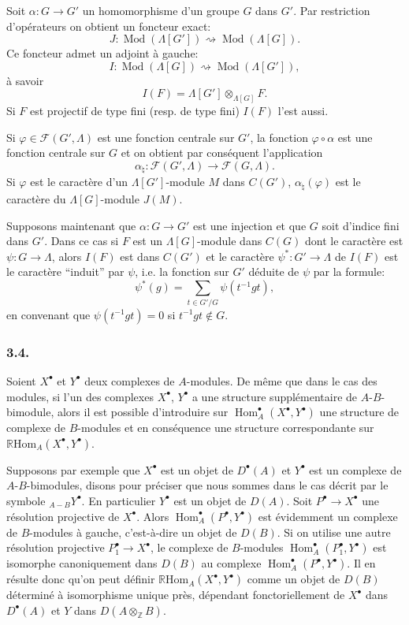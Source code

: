 \documentclass[11pt]{article}
\DeclareMathOperator{\Hom}{Hom}
\newcommand{\R}{\mathbb{R}}\newcommand{\RHomCore}{\mathbb{R}\mathrm{Hom}}
\providecommand{\RHom}{\RHomCore}
\providecommand{\RHom}{\RHomCore}
\providecommand{\Hom}{\operatorname{Hom}}
\providecommand{\RHom}{\R\mathcal{H}om}
\providecommand{\R}{\mathrm R}
\providecommand{\Mod}{\operatorname{Mod}}
\providecommand{\RHom}{\RHomCore}
\providecommand{\Hom}{\operatorname{Hom}}
\begin{document}
Soit $\alpha:G\to G'$ un homomorphisme d'un groupe $G$ dans $G'$. Par restriction d'opérateurs on obtient un foncteur exact:
\[
J:\Mod(\Lambda[G'])\rightsquigarrow\Mod(\Lambda[G]).
\]
Ce foncteur admet un adjoint à gauche:
\[
I:\Mod(\Lambda[G])\rightsquigarrow\Mod(\Lambda[G']),
\]
à savoir
\[
I(F)=\Lambda[G']\otimes_{\Lambda[G]}F.
\]
Si $F$ est projectif de type fini (resp. de type fini) $I(F)$ l'est aussi.

Si $\varphi\in\mathcal F(G',\Lambda)$ est une fonction centrale sur $G'$, la fonction $\varphi\circ\alpha$ est une fonction centrale sur $G$ et on obtient par conséquent l'application
\[
\alpha_\natural: \mathcal F(G',\Lambda)\longrightarrow\mathcal F(G,\Lambda).
\]
Si $\varphi$ est le caractère d'un $\Lambda[G']$-module $M$ dans $C(G')$, $\alpha_\natural(\varphi)$ est le caractère du $\Lambda[G]$-module $J(M)$.

Supposons maintenant que $\alpha:G\to G'$ est une injection et que $G$ soit d'indice fini dans $G'$. Dans ce cas si $F$ est un $\Lambda[G]$-module dans $C(G)$ dont le caractère est $\psi:G\to\Lambda$, alors $I(F)$ est dans $C(G')$ et le caractère $\psi^*:G'\to\Lambda$ de $I(F)$ est le caractère ``induit'' par $\psi$, i.e. la fonction sur $G'$ déduite de $\psi$ par la formule:
\[
\psi^*(g)=\sum_{t\in G'/G}\psi(t^{-1}gt),
\tag{3.3.1}
\]
en
convenant que $\psi(t^{-1}gt)=0$ si $t^{-1}gt\notin G$.

\subsubsection*{3.4.}

Soient $X^\bullet$ et $Y^\bullet$ deux complexes de $A$-modules. De même que dans le cas des modules, si l'un des complexes $X^\bullet$, $Y^\bullet$ a une structure supplémentaire de $A$-$B$-bimodule, alors il est possible d'introduire sur $\Hom_A^\bullet(X^\bullet,Y^\bullet)$ une structure de complexe de $B$-modules et en conséquence une structure correspondante sur $\RHom_A(X^\bullet,Y^\bullet)$.

Supposons par exemple que $X^\bullet$ est un objet de $D^\bullet(A)$ et $Y^\bullet$ est un complexe de $A$-$B$-bimodules, disons pour préciser que nous sommes dans le cas décrit par le symbole ${}_{A-B}Y^\bullet$. En particulier $Y^\bullet$ est un objet de $D(A)$. Soit $P^\bullet\to X^\bullet$ une résolution projective de $X^\bullet$. Alors $\Hom_A^\bullet(P^\bullet,Y^\bullet)$ est évidemment un complexe de $B$-modules à gauche, c'est-à-dire un objet de $D(B)$. Si on utilise une autre résolution projective $P_1^\bullet\to X^\bullet$, le complexe de $B$-modules $\Hom_A^\bullet(P_1^\bullet,Y^\bullet)$ est isomorphe canoniquement dans $D(B)$ au complexe $\Hom_A^\bullet(P^\bullet,Y^\bullet)$. Il en résulte donc qu'on peut définir $\RHom_A(X^\bullet,Y^\bullet)$ comme un objet de $D(B)$ déterminé à isomorphisme unique près, dépendant fonctoriellement de $X^\bullet$ dans $D^\bullet(A)$ et $Y$ dans $D(A\otimes_{\mathbb Z}B)$.
\end{document}
